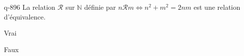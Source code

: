 \begin{truefalse}{q-896}
La relation $\mathcal R$ sur $\mathbb N$ définie par $n\mathcal R m \iff n^2+m^2 = 2nm$ est une relation d'équivalence.
\item* Vrai
\item Faux
\end{truefalse}

